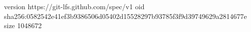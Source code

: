 version https://git-lfs.github.com/spec/v1
oid sha256:0582542e41ef3b9386506d05402d15528297b93785f3f9d39749629a2814677e
size 1048672

